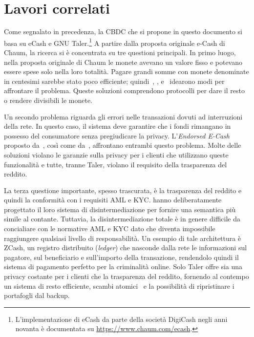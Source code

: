 \documentclass{article}
\begin{document}
\hypertarget{lavori-correlati}{%
\section{Lavori correlati}\label{6.-lavori-correlati}}

Come segnalato in precedenza, la CBDC che si propone in questo documento
si basa su eCash e GNU Taler.\footnote{L'implementazione di eCash
da parte della società DigiCash negli anni novanta è documentata su
\url{https://www.chaum.com/ecash}.} A partire dalla proposta originale
e-Cash di Chaum, la ricerca si è concentrata su tre questioni principali.
In primo luogo, nella proposta originale di Chaum le monete avevano un
valore fisso e potevano essere spese solo nella loro totalità. Pagare
grandi somme con monete denominate in centesimi sarebbe stato poco
efficiente; quindi~\cite{Okamoto}, \cite{Camenisch2005}, \cite{Canard}
e~\cite{Dold} idearono modi per affrontare il problema. Queste soluzioni
comprendono protocolli per dare il resto o rendere divisibili le monete.

Un secondo problema riguarda gli errori nelle transazioni dovuti ad
interruzioni della rete. In questo caso, il sistema deve garantire che
i fondi rimangano in possesso del consumatore senza pregiudicare la
privacy. L'\textit{Endorsed E-Cash} proposto da~\cite{Camenisch2007},
così come da~\cite{Dold}, affrontano entrambi questo problema. Molte
delle soluzioni violano le garanzie sulla privacy per i clienti che
utilizzano queste funzionalità e tutte, tranne Taler, violano il
requisito della trasparenza del reddito.

La terza questione importante, spesso trascurata, è la trasparenza del
reddito e quindi la conformità con i requisiti AML e KYC. \cite{Fuchsbauer}
hanno deliberatamente progettato il loro sistema di disintermediazione
per fornire una semantica più simile al contante. Tuttavia, la
disintermediazione totale è in genere difficile da concialiare con le
normative AML e KYC dato che diventa impossibile raggiungere qualsiasi
livello di responsabilità. Un esempio di tale architettura è ZCash, un
registro distribuito (\textit{ledger}) che nasconde dalla rete le
informazioni sul pagatore, sul beneficiario e sull'importo della
transazione, rendendolo quindi il sistema di pagamento perfetto per la
criminalità online. Solo Taler offre sia una privacy costante per i
clienti che la trasparenza del reddito, fornendo al contempo un sistema
di resto efficiente, scambi atomici~\cite[vedi][]{Camenisch2007} e la
possibilità di ripristinare i portafogli dal backup.
\end{document}
